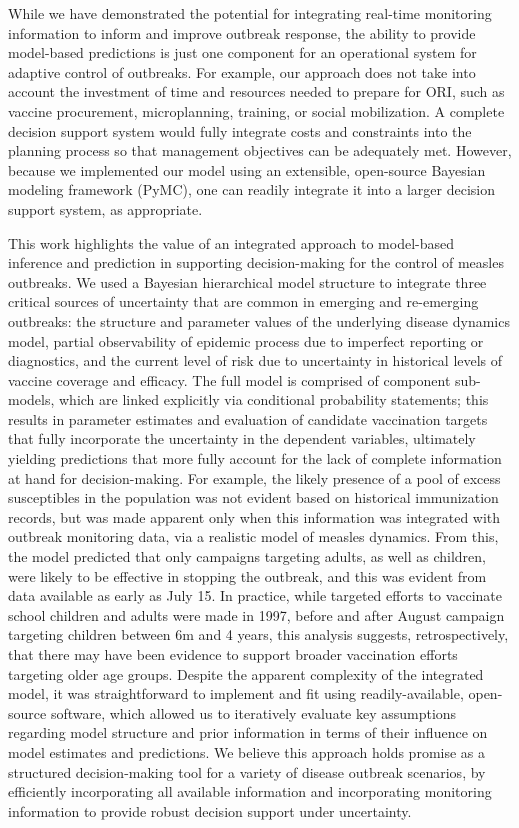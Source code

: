 While we have demonstrated the potential for integrating real-time monitoring information to inform and improve outbreak response, the ability to provide model-based predictions is just one component for an operational system for adaptive control of outbreaks. For example, our approach does not take into account the investment of time and resources needed to prepare for ORI, such as vaccine procurement, microplanning, training, or social mobilization. A complete decision support system would fully integrate costs and constraints into the planning process so that management objectives can be adequately met. However, because we implemented our model using an extensible, open-source Bayesian modeling framework (PyMC), one can readily integrate it into a larger decision support system, as appropriate.

This work highlights the value of an integrated approach to model-based inference and prediction in supporting decision-making for the control of measles outbreaks. We used a Bayesian hierarchical model structure to integrate three critical sources of uncertainty that are common in emerging and re-emerging outbreaks: the structure and parameter values of the underlying disease dynamics model, partial observability of epidemic process due to imperfect reporting or diagnostics, and the current level of risk due to uncertainty in historical levels of vaccine coverage and efficacy. The full model is comprised of component sub-models, which are linked explicitly via conditional probability statements; this results in parameter estimates and evaluation of candidate vaccination targets that fully incorporate the uncertainty in the dependent variables, ultimately yielding predictions that more fully account for the lack of complete information at hand for decision-making. For example, the likely presence of a pool of excess susceptibles in the population was not evident based on historical immunization records, but was made apparent only when this information was integrated with outbreak monitoring data, via a realistic model of measles dynamics. From this, the model predicted that only campaigns targeting adults, as well as children, were likely to be effective in stopping the outbreak, and this was evident from data available as early as July 15. In practice, while targeted efforts to vaccinate school children and adults were made in 1997, before and after August campaign targeting children between 6m and 4 years, this analysis suggests, retrospectively, that there may have been evidence to support broader vaccination efforts targeting older age groups. Despite the apparent complexity of the integrated model, it was straightforward to implement and fit using readily-available, open-source software, which allowed us to iteratively evaluate key assumptions regarding model structure and prior information in terms of their influence on model estimates and predictions. We believe this approach holds promise as a structured decision-making tool for a variety of disease outbreak scenarios, by efficiently incorporating all available information and incorporating monitoring information to provide robust decision support under uncertainty.

